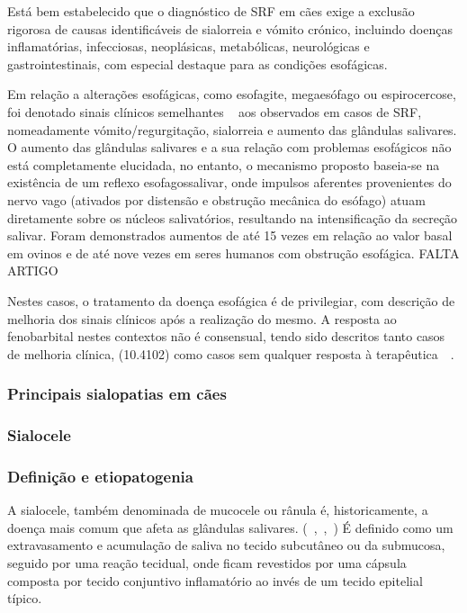 Está bem estabelecido que o diagnóstico de SRF em cães exige a exclusão rigorosa de causas identificáveis de sialorreia e vómito crónico, incluindo doenças inflamatórias, infecciosas, neoplásicas, metabólicas, neurológicas e gastrointestinais, com especial destaque para as condições esofágicas. 


Em relação a alterações esofágicas, como esofagite, megaesófago ou espirocercose, foi denotado sinais clínicos semelhantes ~\cite{Han2016} aos observados em casos de SRF, nomeadamente vómito/regurgitação, sialorreia e aumento das glândulas salivares. O aumento das glândulas salivares e a sua relação com problemas esofágicos não está completamente elucidada, no entanto, o mecanismo proposto baseia-se na existência de um reflexo esofagossalivar, onde impulsos aferentes provenientes do nervo vago (ativados por distensão e obstrução mecânica do esófago) atuam diretamente sobre os núcleos salivatórios, resultando na intensificação da secreção salivar. Foram demonstrados aumentos de até 15 vezes em relação ao valor basal em ovinos e de até nove vezes em seres humanos com obstrução esofágica. FALTA ARTIGO 


Nestes casos, o tratamento da doença esofágica é de privilegiar, com descrição de melhoria dos sinais clínicos após a realização do mesmo. A resposta ao fenobarbital nestes contextos não é consensual, tendo sido descritos tanto casos de melhoria clínica, (10.4102) como casos sem qualquer resposta à terapêutica~~\cite{Walton-Clark2022,gibbon_phenobarbital-responsive_german_2004}.

\subsubsection{Principais sialopatias em cães}
\subsubsection{Sialocele}
\subsubsection{Definição e etiopatogenia}

A sialocele, também denominada de mucocele ou rânula é, historicamente, a doença  mais comum que afeta as glândulas salivares. (~\cite{deLaPuerta2020},~\cite{Cinti2021},~\cite{Olimpo2023}) É definido como um extravasamento e acumulação de saliva no tecido subcutâneo ou da submucosa, seguido por uma reação tecidual, onde ficam revestidos por uma cápsula composta por tecido conjuntivo inflamatório ao invés de um tecido epitelial típico. ~\cite{Zadeh2025,Bae2024,_salivary_}


